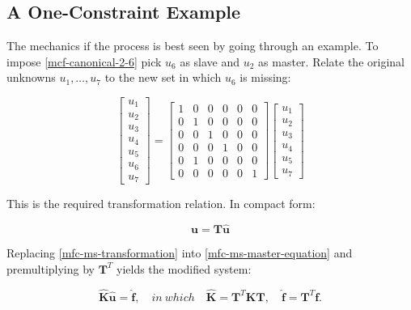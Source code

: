 \documentclass[10pt,b5paper,titlepage]{book}
\newcommand{\m}{\mathbf}
\begin{document}
\subsection{A One-Constraint Example}

The mechanics if the process is best seen by going through an example. To impose
\eqref{mcf-canonical-2-6} pick $ u_6 $ as slave and $ u_2 $ as master. Relate the
original unknowns $ u_1, \dots, u_7 $ to the new set in which $ u_6 $ is missing:

\begin{equation}\label{mfc-ms-transformation}
    \begin{bmatrix}
        u_1 \\
        u_2 \\
        u_3 \\
        u_4 \\
        u_5 \\
        u_6 \\
        u_7
    \end{bmatrix}
    = \begin{bmatrix}
        1 & 0 & 0 & 0 & 0 & 0 \\
        0 & 1 & 0 & 0 & 0 & 0 \\
        0 & 0 & 1 & 0 & 0 & 0 \\
        0 & 0 & 0 & 1 & 0 & 0 \\
        0 & 1 & 0 & 0 & 0 & 0 \\
        0 & 0 & 0 & 0 & 0 & 1
    \end{bmatrix}
    \begin{bmatrix}
        u_1 \\
        u_2 \\
        u_3 \\
        u_4 \\
        u_5 \\
        u_7
    \end{bmatrix}
\end{equation}

This is the required transformation relation. In compact form:

\begin{equation}
    \m{u} = \m{T} \m{\hat{u}}
\end{equation}


Replacing \eqref{mfc-ms-transformation} into \eqref{mfc-ms-master-equation} and
premultiplying by $ \m{T}^T $ yields the modified system:

\begin{equation}\label{mfc-ms-modified-system}
    \m{\hat{K}} \m{\hat{u}} = \m{\hat{f}}, \quad
    in\ which \quad \m{\hat{K}} = \m{T}^T \m{K} \m{T}, \quad
    \m{\hat{f}} = \m{T}^T \m{f}.
\end{equation}
\end{document}
